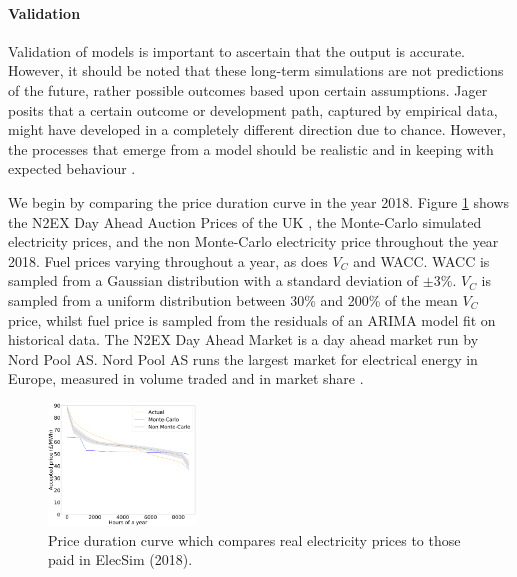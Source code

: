\paragraph{Validation}

 Validation of models is important to ascertain that the output is accurate. However, it should be noted that these long-term simulations are not predictions of the future, rather possible outcomes based upon certain assumptions. Jager posits that a certain outcome or development path, captured by empirical data, might have developed in a completely different direction due to chance. However, the processes that emerge from a model should be realistic and in keeping with expected behaviour \cite{Jager2006a}.

We begin by comparing the price duration curve in the year 2018. Figure \ref{fig:price_duration_curve} shows the N2EX Day Ahead Auction Prices of the UK \cite{nordpool_2019}, the Monte-Carlo simulated electricity prices, and the non Monte-Carlo electricity price throughout the year 2018. Fuel prices varying throughout a year, as does $V_C$ and WACC. WACC is sampled from a Gaussian distribution with a standard deviation of $\pm3$\%. $V_C$ is sampled from a uniform distribution between 30\% and 200\% of the mean $V_C$ price, whilst fuel price is sampled from the residuals of an ARIMA model fit on historical data. The N2EX Day Ahead Market is a day ahead market run by Nord Pool AS. Nord Pool AS runs the largest market for electrical energy in Europe, measured in volume traded and in market share \cite{nordpool_2019}.
\begin{figure}
	\begin{center}
		\includegraphics[width=0.35\textwidth]{figures/load_price_duration_curve_comparison-Monte-Carlo}
		\caption{Price duration curve which compares real electricity prices to those paid in ElecSim (2018).}
		\label{fig:price_duration_curve}
	\end{center}
\end{figure}



